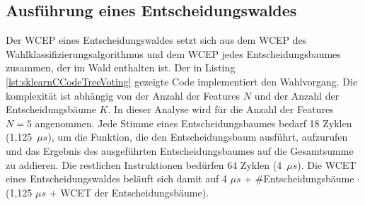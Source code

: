 \subsection{Ausführung eines Entscheidungswaldes}
Der WCEP eines Entscheidungswaldes setzt sich aus dem WCEP des Wahlklassifizierungsalgorithmus und dem WCEP jedes Entscheidungsbaumes zusammen, der im Wald enthalten ist.
\newline
\newline
Der in Listing \ref{lst:sklearnCCodeTreeVoting} gezeigte Code implementiert den Wahlvorgang. Die komplexität ist abhängig von der Anzahl der Features $N$ und der Anzahl der Entscheidungsbäume $K$. In
dieser Analyse wird für die Anzahl der Features $N=5$ angenommen.
Jede Stimme eines Entscheidungsbaumes bedarf 18 Zyklen (1,125\ $\mu s$), um die Funktion, die den Entscheidungsbaum ausführt, aufzurufen und das Ergebnis des ausgeführten Entscheidungsbaumes auf die Gesamtsumme zu addieren.
Die restlichen Instruktionen bedürfen 64 Zyklen (4\ $\mu s$).
\newline
\newline
Die WCET eines Entscheidungswaldes beläuft sich damit auf 4 $\mu s$ + \#Entscheidungsbäume $\cdot$ (1,125 $\mu s$ + WCET der Entscheidungsbäume).